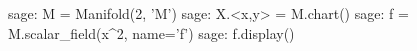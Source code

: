 \documentclass[12pt]{article}
\begin{document}
\lipsum[2-3]
\begin{sagenotebook}
sage: M = Manifold(2, 'M')
sage: X.<x,y> = M.chart()
sage: f = M.scalar_field(x^2, name='f')
sage: f.display()
\end{sagenotebook}
\lipsum[1]
\end{document}
